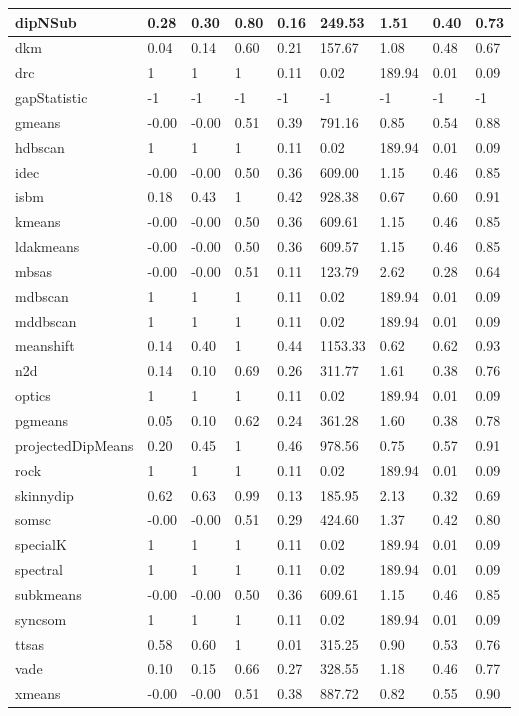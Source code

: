 \begin{table}[H]
\begin{tabular}{|l|l|l|l|l|l|l|l|l|}
\hline
dipNSub & 0.28 & 0.30 & 0.80 & 0.16 & 249.53 & 1.51 & 0.40 & 0.73 \\
\hline
dkm & 0.04 & 0.14 & 0.60 & 0.21 & 157.67 & 1.08 & 0.48 & 0.67 \\
\hline
drc & 1 & 1 & 1 & 0.11 & 0.02 & 189.94 & 0.01 & 0.09 \\
\hline
gapStatistic & -1 & -1 & -1 & -1 & -1 & -1 & -1 & -1 \\
\hline
gmeans & -0.00 & -0.00 & 0.51 & 0.39 & 791.16 & 0.85 & 0.54 & 0.88 \\
\hline
hdbscan & 1 & 1 & 1 & 0.11 & 0.02 & 189.94 & 0.01 & 0.09 \\
\hline
idec & -0.00 & -0.00 & 0.50 & 0.36 & 609.00 & 1.15 & 0.46 & 0.85 \\
\hline
isbm & 0.18 & 0.43 & 1 & 0.42 & 928.38 & 0.67 & 0.60 & 0.91 \\
\hline
kmeans & -0.00 & -0.00 & 0.50 & 0.36 & 609.61 & 1.15 & 0.46 & 0.85 \\
\hline
ldakmeans & -0.00 & -0.00 & 0.50 & 0.36 & 609.57 & 1.15 & 0.46 & 0.85 \\
\hline
mbsas & -0.00 & -0.00 & 0.51 & 0.11 & 123.79 & 2.62 & 0.28 & 0.64 \\
\hline
mdbscan & 1 & 1 & 1 & 0.11 & 0.02 & 189.94 & 0.01 & 0.09 \\
\hline
mddbscan & 1 & 1 & 1 & 0.11 & 0.02 & 189.94 & 0.01 & 0.09 \\
\hline
meanshift & 0.14 & 0.40 & 1 & 0.44 & 1153.33 & 0.62 & 0.62 & 0.93 \\
\hline
n2d & 0.14 & 0.10 & 0.69 & 0.26 & 311.77 & 1.61 & 0.38 & 0.76 \\
\hline
optics & 1 & 1 & 1 & 0.11 & 0.02 & 189.94 & 0.01 & 0.09 \\
\hline
pgmeans & 0.05 & 0.10 & 0.62 & 0.24 & 361.28 & 1.60 & 0.38 & 0.78 \\
\hline
projectedDipMeans & 0.20 & 0.45 & 1 & 0.46 & 978.56 & 0.75 & 0.57 & 0.91 \\
\hline
rock & 1 & 1 & 1 & 0.11 & 0.02 & 189.94 & 0.01 & 0.09 \\
\hline
skinnydip & 0.62 & 0.63 & 0.99 & 0.13 & 185.95 & 2.13 & 0.32 & 0.69 \\
\hline
somsc & -0.00 & -0.00 & 0.51 & 0.29 & 424.60 & 1.37 & 0.42 & 0.80 \\
\hline
specialK & 1 & 1 & 1 & 0.11 & 0.02 & 189.94 & 0.01 & 0.09 \\
\hline
spectral & 1 & 1 & 1 & 0.11 & 0.02 & 189.94 & 0.01 & 0.09 \\
\hline
subkmeans & -0.00 & -0.00 & 0.50 & 0.36 & 609.61 & 1.15 & 0.46 & 0.85 \\
\hline
syncsom & 1 & 1 & 1 & 0.11 & 0.02 & 189.94 & 0.01 & 0.09 \\
\hline
ttsas & 0.58 & 0.60 & 1 & 0.01 & 315.25 & 0.90 & 0.53 & 0.76 \\
\hline
vade & 0.10 & 0.15 & 0.66 & 0.27 & 328.55 & 1.18 & 0.46 & 0.77 \\
\hline
xmeans & -0.00 & -0.00 & 0.51 & 0.38 & 887.72 & 0.82 & 0.55 & 0.90 \\
\hline
\end{tabular}
\end{table}